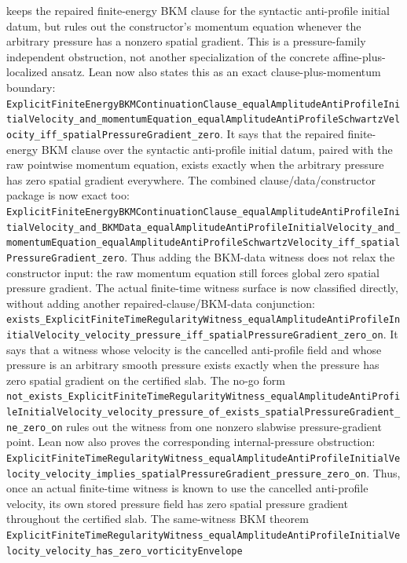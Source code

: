 \documentclass[11pt]{article}
\theoremstyle{remark}
\begin{document}
keeps the repaired finite-energy BKM clause for the syntactic anti-profile
initial datum, but rules out the constructor's momentum equation whenever the
arbitrary pressure has a nonzero spatial gradient.  This is a pressure-family
independent obstruction, not another specialization of the concrete
affine-plus-localized ansatz.
Lean now also states this as an exact clause-plus-momentum boundary:
\texttt{ExplicitFiniteEnergyBKMContinuationClause\_equalAmplitudeAntiProfileInitialVelocity\_and\_momentumEquation\_equalAmplitudeAntiProfileSchwartzVelocity\_iff\_spatialPressureGradient\_zero}.
It says that the repaired finite-energy BKM clause over the syntactic
anti-profile initial datum, paired with the raw pointwise momentum equation,
exists exactly when the arbitrary pressure has zero spatial gradient
everywhere.
The combined clause/data/constructor package is now exact too:
\texttt{ExplicitFiniteEnergyBKMContinuationClause\_equalAmplitudeAntiProfileInitialVelocity\_and\_BKMData\_equalAmplitudeAntiProfileInitialVelocity\_and\_momentumEquation\_equalAmplitudeAntiProfileSchwartzVelocity\_iff\_spatialPressureGradient\_zero}.
Thus adding the BKM-data witness does not relax the constructor input: the raw
momentum equation still forces global zero spatial pressure gradient.
The actual finite-time witness surface is now classified directly, without
adding another repaired-clause/BKM-data conjunction:
\texttt{exists\_ExplicitFiniteTimeRegularityWitness\_equalAmplitudeAntiProfileInitialVelocity\_velocity\_pressure\_iff\_spatialPressureGradient\_zero\_on}.
It says that a witness whose velocity is the cancelled anti-profile field and
whose pressure is an arbitrary smooth pressure exists exactly when the pressure
has zero spatial gradient on the certified slab.  The no-go form
\texttt{not\_exists\_ExplicitFiniteTimeRegularityWitness\_equalAmplitudeAntiProfileInitialVelocity\_velocity\_pressure\_of\_exists\_spatialPressureGradient\_ne\_zero\_on}
rules out the witness from one nonzero slabwise pressure-gradient point.
Lean now also proves the corresponding internal-pressure obstruction:
\texttt{ExplicitFiniteTimeRegularityWitness\_equalAmplitudeAntiProfileInitialVelocity\_velocity\_implies\_spatialPressureGradient\_pressure\_zero\_on}.
Thus, once an actual finite-time witness is known to use the cancelled
anti-profile velocity, its own stored pressure field has zero spatial pressure
gradient throughout the certified slab.  The same-witness BKM theorem
\texttt{ExplicitFiniteTimeRegularityWitness\_equalAmplitudeAntiProfileInitialVelocity\_velocity\_has\_zero\_vorticityEnvelope}
\end{document}
